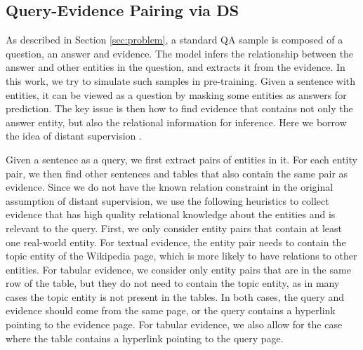\documentclass[11pt]{article}
\newcommand{\add}[1]{\textcolor{red}{#1}}
\newcommand{\nop}[1]{}
\begin{document}
\subsection{Query-Evidence Pairing via DS}
{As described in Section \ref{sec:problem}, a standard QA sample is composed of a question, an answer and evidence. The model infers the relationship between the answer and other entities in the question, and extracts it from the evidence.} In this work, we try to simulate such samples in pre-training. Given a sentence with entities, it can be viewed as a question by masking some entities as answers for prediction. The key issue is then how to find evidence that {contains not only the answer entity, but also the relational information for inference.} Here we borrow the idea of distant supervision \cite{mintz-etal-2009-distant}.\nop{The original distant supervision assumption is that \add{``any sentence that contains a pair of entities that participate in a known knowledge base relation is likely to express that relation in some way''.} We remove the KB relation constraint in the original assumption and generalize it as ``any sentence that contains a pair of related entities is likely to express the relations between the entities in some way''. Given a masked ``question'' sentence, we use other sentences (or tables) that contain the masked ``answer'' entity and another entity in the ``question'' as evidence.}  \nop{c.f.\ the intro of this paper https://arxiv.org/pdf/1704.05958.pdf for the proper way to introduce distant supervision}

Given a sentence as a query, we first extract pairs of entities in it. For each entity pair, we then find other sentences and tables that also contain the same pair as evidence. {Since we do not have the known relation constraint {in the original assumption of distant supervision}, we use the following heuristics to collect evidence that has high quality relational knowledge about the entities and is relevant to the query. First, we only consider entity pairs that contain at least one real-world entity. For textual evidence, the entity pair needs to contain the topic entity of the Wikipedia page, which is more likely to have relations to other entities. For tabular evidence, we consider only entity pairs that are in the same row of the table, but they do not need to contain the topic entity, as in many cases the topic entity is not present in the tables. In both cases, the query and evidence should come from the same page, or the query contains a hyperlink pointing to the evidence page. For tabular evidence, we also allow for the case where the table contains a hyperlink pointing to the query page.}
\end{document}
